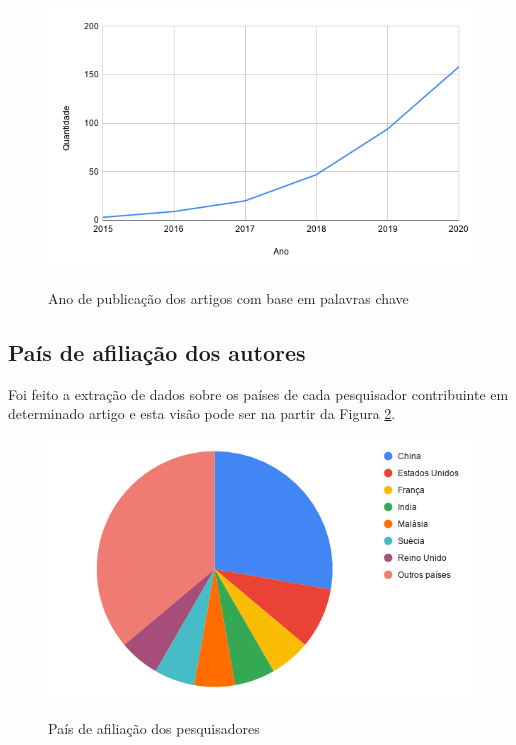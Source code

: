 \documentclass[
	12pt,				%
	oneside,			%
	a4paper,			%
	english,			%
	brazil				%
	]{abntex2ppgsi}
\begin{document}
\begin{figure}[H]
    \centering
    \caption{Ano de publicação dos artigos com base em palavras chave}
    \includegraphics[scale=.60]{imagens/grafico_ano_vs_quantidade.png}
    \label{fig:grafico_ano_vs_quantidade}
\end{figure}

\subsection{País de afiliação dos autores}

Foi feito a extração de dados sobre os países de cada pesquisador contribuinte em determinado artigo e esta visão pode ser na partir da Figura \ref{fig:grafico_pais_vs_publicacao}.

\begin{figure}[H]
    \centering
    \caption{País de afiliação dos pesquisadores}
    \includegraphics[scale=.60]{imagens/grafico_pais_vs_publicacao.png}
    \label{fig:grafico_pais_vs_publicacao}
\end{figure}
\end{document}
